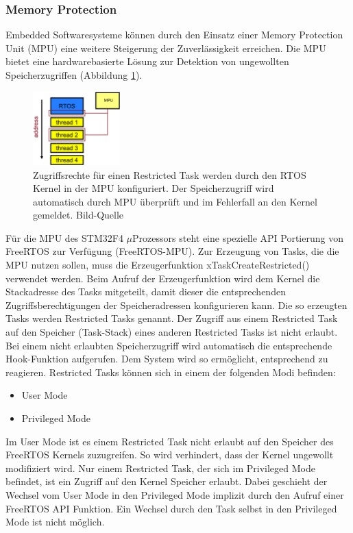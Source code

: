 \subsubsection{Memory Protection}
\label{sec:Memory Protection}
Embedded Softwaresysteme können durch den Einsatz einer Memory Protection Unit (MPU) eine weitere Steigerung der Zuverlässigkeit erreichen. Die MPU bietet eine hardwarebasierte Lösung zur Detektion von ungewollten Speicherzugriffen (Abbildung \ref{fig:AddressSpaceMMU}). 
\begin{figure}[htb]
	\centering
		\includegraphics[width=0.3\textwidth]{Pictures/EmbeddedCom/addressSpaceMMU}
	\caption{Zugriffsrechte für einen Restricted Task werden durch den RTOS Kernel in der MPU konfiguriert. Der Speicherzugriff wird automatisch durch MPU überprüft und im Fehlerfall an den Kernel gemeldet. Bild-Quelle~\protect{}}
	\label{fig:AddressSpaceMMU}
\end{figure} 
Für die MPU des STM32F4 $\mu$\-Pro\-zesso\-rs steht eine spezielle API Portierung von FreeRTOS zur Verfügung (FreeRTOS-MPU). Zur Erzeugung von Tasks, die die MPU nutzen sollen, muss die Erzeugerfunktion xTaskCreateRestricted() verwendet werden. Beim Aufruf der Erzeugerfunktion wird dem Kernel die Stackadresse des Tasks mitgeteilt, damit dieser die entsprechenden Zugriffsberechtigungen der Speicheradressen konfigurieren kann. Die so erzeugten Tasks werden Restricted Tasks genannt. Der Zugriff aus einem Restricted Task auf den Speicher (Task-Stack) eines anderen Restricted Tasks ist nicht erlaubt. Bei einem nicht erlaubten Speicherzugriff wird automatisch die entsprechende Hook-Funktion aufgerufen. Dem System wird so ermöglicht, entsprechend zu reagieren. Restricted Tasks kön\-nen sich in einem der folgenden Modi befinden:
\begin{itemize}
	\item User Mode
	\item Privileged Mode 
\end{itemize}
Im User Mode ist es einem Restricted Task nicht erlaubt auf den Speicher des FreeRTOS Kernels zuzugreifen. So wird verhindert, dass der Kernel ungewollt modifiziert wird. Nur einem Restricted Task, der sich im Privileged Mode befindet, ist ein Zugriff auf den Kernel Speicher erlaubt. Dabei geschieht der Wechsel vom User Mode in den Privileged Mode implizit durch den Aufruf einer FreeRTOS API Funktion. Ein Wechsel durch den Task selbst in den Privileged Mode ist nicht möglich.

